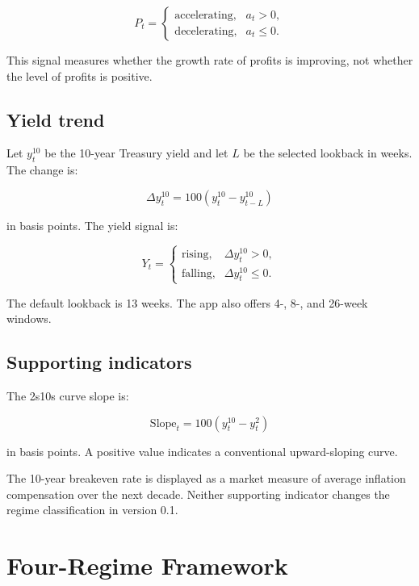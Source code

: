 \documentclass[11pt]{article}
\begin{document}
\[
P_t =
\begin{cases}
\text{accelerating}, & a_t>0,\\
\text{decelerating}, & a_t\leq0.
\end{cases}
\]

This signal measures whether the growth rate of profits is improving, not
whether the level of profits is positive.

\subsection{Yield trend}

Let $y_t^{10}$ be the 10-year Treasury yield and let $L$ be the selected
lookback in weeks. The change is:

\[
\Delta y_t^{10}=100\left(y_t^{10}-y_{t-L}^{10}\right)
\]

in basis points. The yield signal is:

\[
Y_t =
\begin{cases}
\text{rising}, & \Delta y_t^{10}>0,\\
\text{falling}, & \Delta y_t^{10}\leq0.
\end{cases}
\]

The default lookback is 13 weeks. The app also offers 4-, 8-, and
26-week windows.

\subsection{Supporting indicators}

The 2s10s curve slope is:

\[
\mathrm{Slope}_t=100\left(y_t^{10}-y_t^{2}\right)
\]

in basis points. A positive value indicates a conventional upward-sloping
curve.

The 10-year breakeven rate is displayed as a market measure of average
inflation compensation over the next decade. Neither supporting indicator
changes the regime classification in version 0.1.

\section{Four-Regime Framework}
\end{document}

